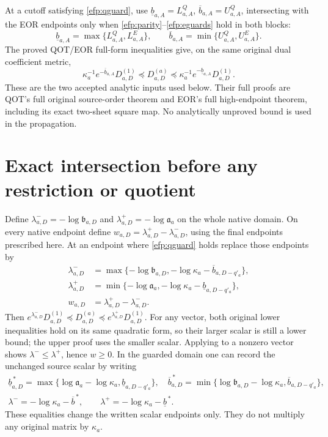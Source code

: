 \documentclass[11pt,a4paper]{article}
\begin{document}
At a cutoff satisfying \eqref{efp:qguard}, use
$\underline b_{a,A}=L^Q_{a,A}$,
$\overline b_{a,A}=U^Q_{a,A}$, intersecting with the EOR endpoints
only when \eqref{efp:parity}--\eqref{efp:eguards} hold in both blocks:
\[
\underline b_{a,A}=\max\{L^Q_{a,A},L^E_{a,A}\},\qquad
\overline b_{a,A}=\min\{U^Q_{a,A},U^E_{a,A}\}.
\tag{EFP9}\label{efp:qor}
\]
The proved QOT/EOR full-form inequalities give, on the same original
dual coefficient metric,
\[
\kappa_a^{-1}e^{-\overline b_{a,A}}D_{a,D}^{(1)}
 \preceq D_{a,D}^{(a)}
 \preceq\kappa_a^{-1}e^{-\underline b_{a,A}}D_{a,D}^{(1)}.
\tag{EFP10}\label{efp:analyticdual}
\]
These are the two accepted analytic inputs used below. Their full proofs
are QOT's full original source-order theorem and EOR's full high-endpoint
theorem, including its exact two-sheet square map. No analytically
unproved bound is used in the propagation.

\section{Exact intersection before any restriction or quotient}
Define $\lambda^-_{a,D}=-\log\mathfrak b_{a,D}$ and
$\lambda^+_{a,D}=-\log\mathfrak a_a$ on the whole native domain.
On every native endpoint define $w_{a,D}=\lambda^+_{a,D}-\lambda^-_{a,D}$,
using the final endpoints prescribed here.
At an endpoint where \eqref{efp:qguard} holds replace those endpoints by
\[
\begin{aligned}
\lambda^-_{a,D}
 &=\max\{-\log\mathfrak b_{a,D},
                    -\log\kappa_a-\overline b_{a,D-q'_a}\},\\
\lambda^+_{a,D}
 &=\min\{-\log\mathfrak a_a,
                    -\log\kappa_a-\underline b_{a,D-q'_a}\},\\
w_{a,D}&=\lambda^+_{a,D}-\lambda^-_{a,D}.
\end{aligned}\tag{EFP11}\label{efp:lambda}
\]
Then
$e^{\lambda^-_{a,D}}D^{(1)}_{a,D}
 \preceq D^{(a)}_{a,D}\preceq
 e^{\lambda^+_{a,D}}D^{(1)}_{a,D}$.
For any vector, both original lower inequalities hold on its same
quadratic form, so their larger scalar is still a lower bound; the
upper proof uses the smaller scalar. Applying to a nonzero vector
shows $\lambda^-\le\lambda^+$, hence $w\ge0$.
In the guarded domain one can record the unchanged source scalar by
writing
\[
\begin{gathered}
\underline b^{\,*}_{a,D}
 =\max\{\log\mathfrak a_a-\log\kappa_a,\underline b_{a,D-q'_a}\},
\quad
\overline b^{\,*}_{a,D}
 =\min\{\log\mathfrak b_{a,D}-\log\kappa_a,\overline b_{a,D-q'_a}\},\\
\lambda^-=-\log\kappa_a-\overline b^{\,*},\qquad
\lambda^+=-\log\kappa_a-\underline b^{\,*}.
\end{gathered}\tag{EFP12}\label{efp:center}
\]
These equalities change the written scalar endpoints only. They do
not multiply any original matrix by $\kappa_a$.
\end{document}
